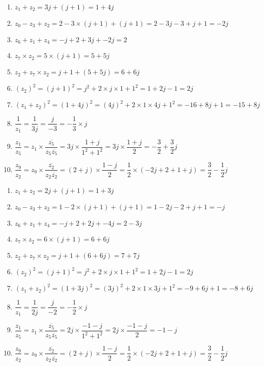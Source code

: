 \documentclass[11pt]{article}
\begin{document}
\begin{multicols}{2}

  \begin{enumerate}
  \item $z_{1} + z_{2} = 3j + (j+1) = 1 + 4j$
  \item $z_{0} - z_{3} + z_{2} = 2-3\times(j + 1) + (j + 1) = 2 - 3j -3 + j + 1= -2j$
  \item $z_{6}+ z_{1} + z_{4} = -j +2 + 3j + -2j = 2$
  \item $z_{7} \times z_{2} = 5\times (j+1) = 5 + 5j$
  \item $z_{2} + z_{7} \times z_{2} = j + 1 + (5 + 5j) = 6 + 6j$
  \item $(z_{2})^{2} = (j+1)^{2} = j^2 + 2\times j \times 1 + 1^2 = 1 + 2j - 1 = 2j$
  \item $(z_{1} + z_{2})^{2} = (1 + 4j)^2 = (4j)^2 + 2\times 1\times 4j + 1^2 = -16 + 8j + 1 = -15 + 8j$
  \item $\dfrac{1}{z_{1}} = \dfrac{1}{3j} = \dfrac{j}{-3} = -\dfrac{1}{3}\times j$
  \item $\dfrac{z_1}{z_5} = z_1 \times \dfrac{\overline{z_5}}{z_5 \overline{z_5}} = 3j \times \dfrac{1+j}{1^2 + 1^2} = 3j \times \dfrac{1+j}{2} = -\dfrac{3}{2} + \dfrac{3}{2}j$
  \item $\dfrac{z_9}{z_2} = z_9 \times \dfrac{\overline{z_2}}{z_2 \overline{z_2}} = (2+j) \times \dfrac{1-j}{2} = \dfrac{1}{2} \times \left( -2j + 2 + 1 + j \right) = \dfrac{3}{2} - \dfrac{1}{2}j$
  \end{enumerate}

  \begin{enumerate}
  \item $z_{1} + z_{2} = 2j + (j+1) = 1 + 3j$
  \item $z_{0} - z_{3} + z_{2} = 1 - 2\times(j + 1) + (j + 1) = 1 - 2j - 2 + j + 1 = -j$
  \item $z_{6}+ z_{1} + z_{4} = -j + 2 + 2j + -4j = 2 - 3j$
  \item $z_{7} \times z_{2} = 6\times (j+1) = 6 + 6j$
  \item $z_{2} + z_{7} \times z_{2} = j + 1 + (6 + 6j) = 7 + 7j$
  \item $(z_{2})^{2} = (j+1)^{2} = j^2 + 2\times j \times 1 + 1^2 = 1 + 2j - 1 = 2j$
  \item $(z_{1} + z_{2})^{2} = (1 + 3j)^2 = (3j)^2 + 2\times 1\times 3j + 1^2 = -9 + 6j + 1 = -8 + 6j$
  \item $\dfrac{1}{z_{1}} = \dfrac{1}{2j} = \dfrac{j}{-2} = -\dfrac{1}{2}\times j$
  \item $\dfrac{z_1}{z_5} = z_1 \times \dfrac{\overline{z_5}}{z_5 \overline{z_5}} = 2j \times \dfrac{-1-j}{1^2 + 1^2} = 2j \times \dfrac{-1-j}{2} = -1 - j$
  \item $\dfrac{z_9}{z_2} = z_9 \times \dfrac{\overline{z_2}}{z_2 \overline{z_2}} = (2+j) \times \dfrac{1-j}{2} = \dfrac{1}{2} \times \left( -2j + 2 + 1 + j \right) = \dfrac{3}{2} - \dfrac{1}{2}j$
  \end{enumerate}
\end{multicols}
\end{document}
